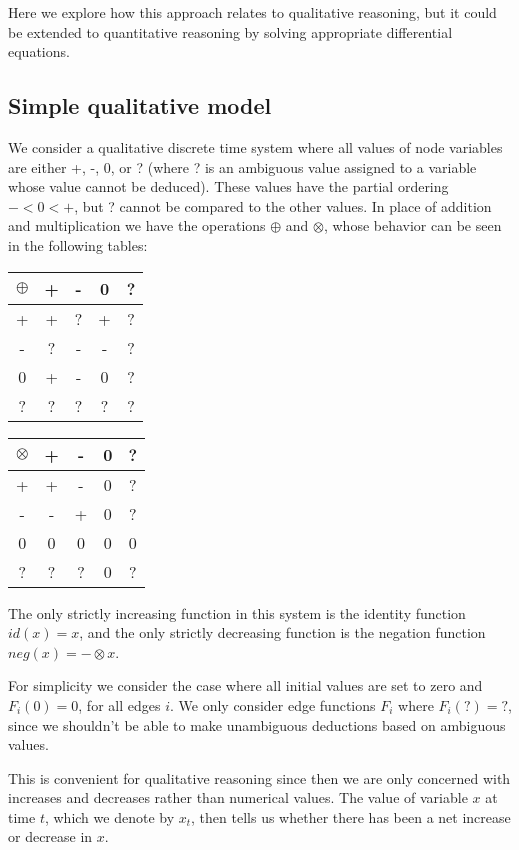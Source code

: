 \documentclass[a4paper,11pt]{article}
\begin{document}
Here we explore how this approach relates to qualitative reasoning,
but it could be extended to quantitative reasoning by solving
appropriate differential equations.

\subsection{Simple qualitative model}

We consider a qualitative discrete time system where all values of
node variables are either +, -, 0, or ? (where ? is an ambiguous value assigned
to a variable whose value cannot be deduced). These values have the partial
ordering $- < 0 < +$, but ? cannot be compared to the other values. In place of
addition and multiplication we have the operations $\oplus$ and $\otimes$, whose
behavior can be seen in the following tables:
\begin{center}
\begin{tabular}{c|cccc}
$\oplus$ & + & - & 0 & ?\\
\hline
  +   & +  & ? & + & ?\\
  -   & ?  & - & - & ?\\
  0   & +  & - & 0 & ?\\
  ?   & ?  & ? & ? & ?\\
\end{tabular}
\quad
\begin{tabular}{c|cccc}
$\otimes$ & + & - & 0 & ?\\
\hline
  +   & +  & - & 0 & ?\\
  -   & -  & + & 0 & ?\\
  0   & 0  & 0 & 0 & 0\\
  ?   & ?  & ? & 0 & ?\\
\end{tabular}
\end{center}
The only
strictly increasing function in this system is the identity function $id(x) =
x$, and the only strictly decreasing function is the negation function $neg(x) =-\otimes x$.

For simplicity we consider the case where all initial values are
set to zero and $F_i(0)=0$, for all edges $i$. We only consider edge functions
$F_i$ where $F_i(?) = ?$, since we shouldn't be able to make unambiguous
deductions based on ambiguous values.
%

This is convenient for qualitative reasoning since then we are only
concerned with increases and decreases rather than numerical values.
%
The value of variable $x$ at time $t$, which we denote by $x_t$, then tells us whether there has been a net
increase or decrease in $x$.
\end{document}
